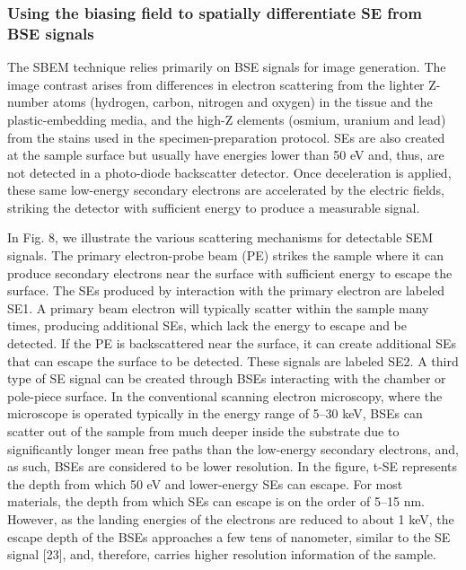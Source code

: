 \documentclass{article}
\begin{document}
\subsubsection*{Using the biasing field to spatially differentiate SE from BSE signals}
The SBEM technique relies primarily on BSE signals for image generation. The image contrast arises from differences in electron scattering from the lighter Z-number atoms (hydrogen, carbon, nitrogen and oxygen) in the tissue and the plastic-embedding media, and the high-Z elements (osmium, uranium and lead) from the stains used in the specimen-preparation protocol. SEs are also created at the sample surface but usually have energies lower than 50 eV and, thus, are not detected in a photo-diode backscatter detector. Once deceleration is applied, these same low-energy secondary electrons are accelerated by the electric fields, striking the detector with sufficient energy to produce a measurable signal.

In Fig. 8, we illustrate the various scattering mechanisms for detectable SEM signals. The primary electron-probe beam (PE) strikes the sample where it can produce secondary electrons near the surface with sufficient energy to escape the surface. The SEs produced by interaction with the primary electron are labeled SE1. A primary beam electron will typically scatter within the sample many times, producing additional SEs, which lack the energy to escape and be detected. If the PE is backscattered near the surface, it can create additional SEs that can escape the surface to be detected. These signals are labeled SE2. A third type of SE signal can be created through BSEs interacting with the chamber or pole-piece surface. In the conventional scanning electron microscopy, where the microscope is operated typically in the energy range of 5–30 keV, BSEs can scatter out of the sample from much deeper inside the substrate due to significantly longer mean free paths than the low-energy secondary electrons, and, as such, BSEs are considered to be lower resolution. In the figure, t-SE represents the depth from which 50 eV and lower-energy SEs can escape. For most materials, the depth from which SEs can escape is on the order of 5–15 nm. However, as the landing energies of the electrons are reduced to about 1 keV, the escape depth of the BSEs approaches a few tens of nanometer, similar to the SE signal [23], and, therefore, carries higher resolution information of the sample.
\end{document}
